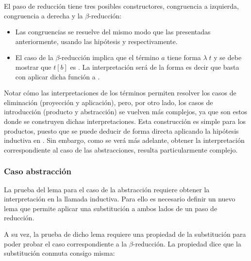 
El paso de reducción tiene tres posibles constructores, congruencia a izquierda, congruencia a derecha y la $\beta$-reducción:

\begin{itemize}
	\item Las congruencias se resuelve del mismo modo que las presentadas anteriormente, usando las hipótesis  y  respectivamente.
	\item El caso de la $\beta$-reducción implica que el término $a$ tiene forma $\lambda\; t$ y se debe mostrar que $t [b]$ es \snstar.
	La interpretación  será de la forma
	\snstar{}
	\snstar{}
	es decir que basta con aplicar dicha función a .
\end{itemize}


Notar cómo las interpretaciones de los términos permiten resolver los casos de eliminación (proyección y aplicación), pero, por otro lado, los casos de introducción (producto y abstracción) se vuelven más complejos, ya que son estos donde se construyen dichas interpretaciones.
Esta construcción es simple para los productos, puesto que se puede deducir de forma directa aplicando la hipótesis inductiva en .	
Sin embargo, como se verá más adelante, obtener la interpretación correspondiente al caso de las abstracciones, resulta particularmente complejo.

\subsubsection{Caso abstracción}

La prueba del lema para el caso de la abstracción requiere obtener la interpretación  en la llamada inductiva.
Para ello es necesario definir un nuevo lema que permite aplicar una substitución a ambos lados de un paso de reducción.


A su vez, la prueba de dicho lema requiere una propiedad de la substitución para poder probar el caso correspondiente a la $\beta$-reducción.
La propiedad  dice que la substitución conmuta consigo misma:

